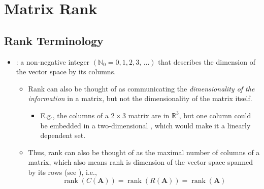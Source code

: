 \chapter{Matrix Rank}\label{Matrix Rank}
\section{Rank Terminology}\label{Rank Terminology}
\begin{itemize}
  \item {}: a non-negative integer \((\mathbb{N}_0 = 0, 1, 2, 3,\,\dots)\) that describes the dimension of the vector space \hyperref[Span]{} by its columns.
    \begin{itemize}
      \item Rank can also be thought of as communicating the \emph{dimensionality of the information} in a matrix, but not the dimensionality of the matrix itself.
      \begin{itemize}
        \item E.g., the columns of a \(2\times 3\) matrix are in \(\mathbb{R}^3\), but one column could be embedded in a two-dimensional \hyperref[Subspace]{}, which would make it a linearly dependent set.
      \end{itemize}
      \item Thus, rank can also be thought of as the maximal number of \hyperref[Linear Independence]{} columns of a matrix, which also means rank is dimension of the vector space spanned by its rows  (see \hyperref[Column Space]{}), i.e.,
      \[%
      \operatorname{rank}(C(\bm{A})) = \operatorname{rank}(R(\bm{A})) = \operatorname{rank}(\bm{A})
      \]%
    \end{itemize}
  

\end{itemize}
